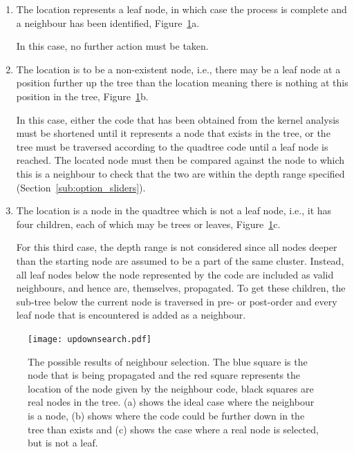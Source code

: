 \begin{enumerate}
	\item The location represents a leaf node, in which case the process is
		complete and a neighbour has been identified,
		Figure~\ref{fig:updownsearch}a.

		In this case, no further action must be taken.

	\item The location is to be a non-existent node, i.e., there may be a leaf
		node at a position further up the tree than the location meaning there
		is nothing at this position in the tree,
		Figure~\ref{fig:updownsearch}b.

		In this case, either the code that has been obtained from the kernel
		analysis must be shortened until it represents a node that exists in
		the tree, or the tree must be traversed according to the quadtree code
		until a leaf node is reached. The located node must then be compared
		against the node to which this is a neighbour to check that the two are
		within the depth range specified (Section~\ref{sub:option_sliders}).

	\item The location is a node in the quadtree which is not a leaf node,
		i.e., it has four children, each of which may be trees or leaves,
		Figure~\ref{fig:updownsearch}c.

		For this third case, the depth range is not considered since all nodes
		deeper than the starting node are assumed to be a part of the same
		cluster. Instead, all leaf nodes below the node represented by the code
		are included as valid neighbours, and hence are, themselves,
		propagated. To get these children, the sub-tree below the current node
		is traversed in pre- or post-order and every leaf node that is
		encountered is added as a neighbour.

\end{enumerate}

\begin{figure}[tbh]
	\centering
	\texttt{[image: updownsearch.pdf]}
	\caption[Possible results of neighbour selection.]{The possible results of
		neighbour selection. The blue square is the node that is being
		propagated and the red square represents the location of the node given
		by the neighbour code, black squares are real nodes in the tree. (a)
		shows the ideal case where the neighbour is a node, (b) shows where the
		code could be further down in the tree than exists and (c) shows the
		case where a real node is selected, but is not a leaf.}\label{fig:updownsearch}
\end{figure}
